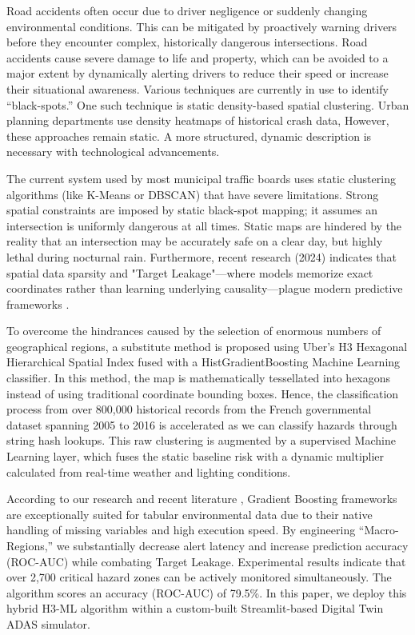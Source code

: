 \documentclass[conference]{IEEEtran}
\begin{document}
Road accidents often occur due to driver negligence or suddenly changing environmental conditions. This can be mitigated by proactively warning drivers before they encounter complex, historically dangerous intersections. Road accidents cause severe damage to life and property, which can be avoided to a major extent by dynamically alerting drivers to reduce their speed or increase their situational awareness. Various techniques are currently in use to identify ``black-spots.'' One such technique is static density-based spatial clustering. Urban planning departments use density heatmaps of historical crash data, However, these approaches remain static. A more structured, dynamic description is necessary with technological advancements.

The current system used by most municipal traffic boards uses static clustering algorithms (like K-Means or DBSCAN) that have severe limitations. Strong spatial constraints are imposed by static black-spot mapping; it assumes an intersection is uniformly dangerous at all times. Static maps are hindered by the reality that an intersection may be accurately safe on a clear day, but highly lethal during nocturnal rain. Furthermore, recent research (2024) indicates that spatial data sparsity and "Target Leakage"—where models memorize exact coordinates rather than learning underlying causality—plague modern predictive frameworks \cite{ref7}. 

To overcome the hindrances caused by the selection of enormous numbers of geographical regions, a substitute method is proposed using Uber's H3 Hexagonal Hierarchical Spatial Index fused with a HistGradientBoosting Machine Learning classifier. In this method, the map is mathematically tessellated into hexagons instead of using traditional coordinate bounding boxes. Hence, the classification process from over 800,000 historical records from the French governmental dataset spanning 2005 to 2016 is accelerated as we can classify hazards through string hash lookups. This raw clustering is augmented by a supervised Machine Learning layer, which fuses the static baseline risk with a dynamic multiplier calculated from real-time weather and lighting conditions.

According to our research and recent literature \cite{ref9}, Gradient Boosting frameworks are exceptionally suited for tabular environmental data due to their native handling of missing variables and high execution speed. By engineering ``Macro-Regions,'' we substantially decrease alert latency and increase prediction accuracy (ROC-AUC) while combating Target Leakage. Experimental results indicate that over 2,700 critical hazard zones can be actively monitored simultaneously. The algorithm scores an accuracy (ROC-AUC) of 79.5\%. In this paper, we deploy this hybrid H3-ML algorithm within a custom-built Streamlit-based Digital Twin ADAS simulator.
\end{document}
